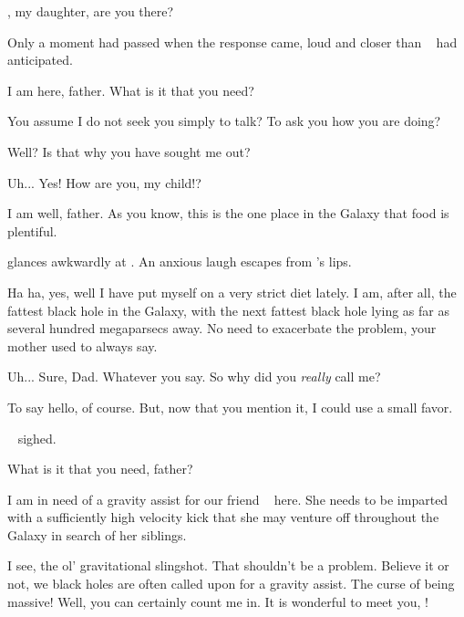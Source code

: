 \documentclass[main.tex]{subfiles}
\begin{document}
\par \Chiron \rmhippe, my daughter, are you there?

\par \nar Only a moment had passed when the response came, loud and closer than \rmelectra~ had anticipated.

\par \Hippe I am here, father.  What is it that you need?

\par \Chiron You assume I do not seek you simply to talk?  To ask you how you are doing?

\par \Hippe Well?  Is that why you have sought me out?

\par \Chiron Uh... Yes!  How are you, my child!?

\par \Hippe I am well, father.  As you know, this is the one place in the Galaxy that food is plentiful.  

\par \nar \rmchiron glances awkwardly at \rmelectra.  An anxious laugh escapes from \rmchiron's lips.    

\par \Chiron Ha ha, yes, well I have put myself on a very strict diet lately.  I am, after all, the fattest black hole in the Galaxy, with the next fattest black hole lying as far as several hundred megaparsecs away.  No need to exacerbate the problem, your mother used to always say.

\par \Hippe Uh... Sure, Dad.  Whatever you say.  So why did you \textit{really} call me?

\par \Chiron To say hello, of course.  But, now that you mention it, I could use a small favor.  

\par \nar \rmhippe~ sighed.

\par \Hippe What is it that you need, father?

\par \Chiron I am in need of a gravity assist for our friend \rmelectra~ here.  She needs to be imparted with a sufficiently high velocity kick that she may venture off throughout the Galaxy in search of her siblings.  

\par \Hippe I see, the ol' gravitational slingshot.  That shouldn't be a problem.  Believe it or not, we black holes are often called upon for a gravity assist.  The curse of being massive!   Well, you can certainly count me in.  It is wonderful to meet you, \rmelectra!
\end{document}

